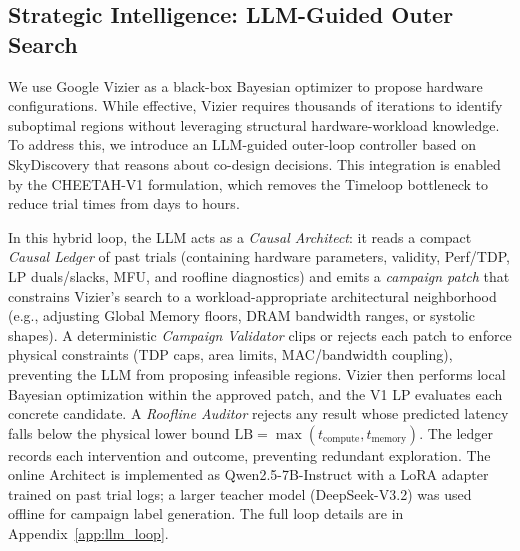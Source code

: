 \subsection{Strategic Intelligence: LLM-Guided Outer Search}
\label{sec:llm_outer}
We use Google Vizier as a black-box Bayesian optimizer to propose hardware configurations. While effective, Vizier requires thousands of iterations to identify suboptimal regions without leveraging structural hardware-workload knowledge. To address this, we introduce an LLM-guided outer-loop controller based on SkyDiscovery that reasons about co-design decisions. This integration is enabled by the CHEETAH-V1 formulation, which removes the Timeloop bottleneck to reduce trial times from days to hours.

In this hybrid loop, the LLM acts as a \emph{Causal Architect}: it reads a compact \emph{Causal Ledger} of past trials (containing hardware parameters, validity, Perf/TDP, LP duals/slacks, MFU, and roofline diagnostics) and emits a \emph{campaign patch} that constrains Vizier's search to a workload-appropriate architectural neighborhood (e.g., adjusting Global Memory floors, DRAM bandwidth ranges, or systolic shapes). A deterministic \emph{Campaign Validator} clips or rejects each patch to enforce physical constraints (TDP caps, area limits, MAC/bandwidth coupling), preventing the LLM from proposing infeasible regions. 
Vizier then performs local Bayesian optimization within the approved patch, and the V1 LP evaluates each concrete candidate. A \emph{Roofline Auditor} rejects any result whose predicted latency falls below the physical lower bound $\mathrm{LB} = \max(t_{\text{compute}}, t_{\text{memory}})$. 
The ledger records each intervention and outcome, preventing redundant exploration. The online Architect is implemented as Qwen2.5-7B-Instruct \citep{qwen25technicalreport} with a LoRA \citep{hu2021lora} adapter trained on past trial logs; a larger teacher model (DeepSeek-V3.2) was used offline for campaign label generation. The full loop details are in Appendix~\ref{app:llm_loop}.  
